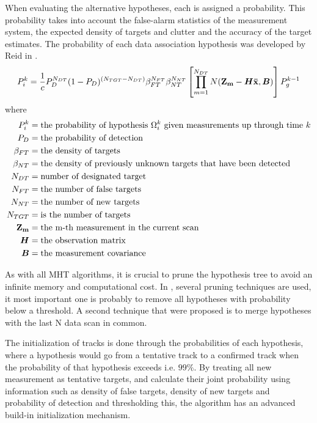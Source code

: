 When evaluating the alternative hypotheses, each is assigned a probability. This probability takes into account the false-alarm statistics of the measurement system, the expected density of targets and clutter and the accuracy of the target estimates. The probability of each data association hypothesis was developed by Reid in \cite{Reid1978}.
\begin{equation}
P_i^k = \frac{1}{c} P_D^{N_{DT}}(1-P_D)^{(N_{TGT}-N_{DT})} \beta_{FT}^{N_{FT}} \beta_{NT}^{N_{NT}} \left[ \prod_{m=1}^{N_{DT}} N(\boldsymbol{\mathbf{Z_m}}-\bm{H}\boldsymbol{\mathbf{\bar{x}}},\bm{B}) \right] P_g^{k-1}
\label{eq:homht_probability}
\end{equation}
where 
\begin{equation*}
\begin{split}
	P_i^k		&= \text{the probability of hypothesis $\Omega_i^k$ given measurements up through time $k$} \\
	P_D 		&= \text{the probability of detection} \\
	\beta_{FT} 	&= \text{the density of targets} \\ 
	\beta_{NT}	&= \text{the density of previously unknown targets that have been detected} \\
	N_{DT} 		&=	\text{number of designated target} \\
	N_{FT} 		&= \text{the number of false targets} \\
	N_{NT} 		&= \text{the number of new targets} \\
	N_{TGT} 	&= \text{is the number of targets} \\
	\boldsymbol{\mathbf{Z_m}} 	&= \text{the m-th measurement in the current scan} \\
	\bm{H} 		&= \text{the observation matrix} \\
	\bm{B} 		&= \text{the measurement covariance}
\end{split}
\end{equation*}

As with all MHT algorithms, it is crucial to prune the hypothesis tree to avoid an infinite memory and computational cost. In \cite{Reid1978}, several pruning techniques are used, it most important one is probably to remove all hypotheses with probability below a threshold. A second technique that were proposed is to merge hypotheses with the last N data scan in common. 

The initialization of tracks is done through the probabilities of each hypothesis, where a hypothesis would go from a tentative track to a confirmed track when the probability of that hypothesis exceeds i.e. $99 \%$. By treating all new measurement as tentative targets, and calculate their joint probability using information such as density of false targets, density of new targets and probability of detection and thresholding this, the algorithm has an advanced build-in initialization mechanism.

